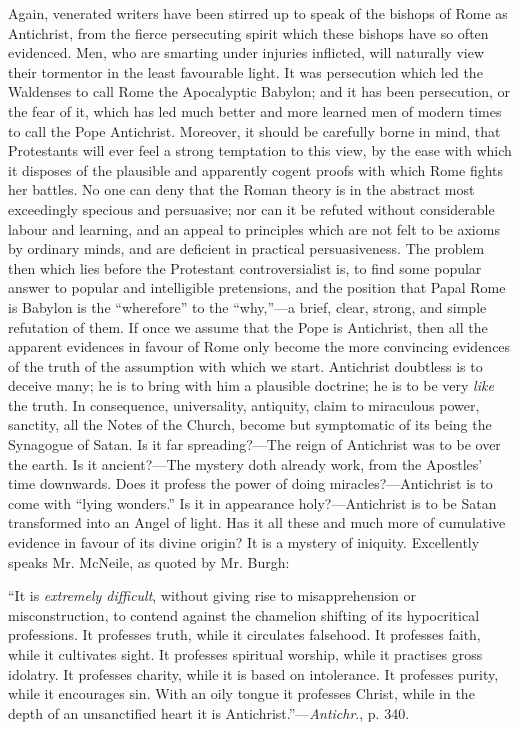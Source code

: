 Again, venerated writers have been stirred up to speak of the
bishops of Rome as Antichrist, from the fierce persecuting spirit
which these bishops have so often evidenced. Men, who are smarting
under injuries inflicted, will naturally view their tormentor in the
least favourable light. It was persecution which led the Waldenses to
call Rome the Apocalyptic Babylon; and it has been persecution, or the
fear of it, which has led much better and more learned men of modern
times to call the Pope Antichrist. Moreover, it should be carefully
borne in mind, that Protestants will ever feel a strong temptation to
this view, by the ease with which it disposes of the plausible and
apparently cogent proofs with which Rome fights her battles. No one
can deny that the Roman theory is in the abstract most exceedingly
specious and persuasive; nor can it be refuted without considerable
labour and learning, and an appeal to principles which are not felt to
be axioms by ordinary minds, and are deficient in practical
persuasiveness. The problem then which lies before the Protestant
controversialist is, to find some popular answer to popular and
intelligible pretensions, and the position that Papal Rome is Babylon
is the ``wherefore'' to the ``why,''—a brief, clear,
strong, and simple refutation of them. If once we assume that the Pope
is Antichrist, then all the apparent evidences in favour of Rome only
become the more convincing evidences of the truth of the assumption
with which we start. Antichrist doubtless is to deceive many; he is to
bring with him a plausible doctrine; he is to be very \emph{like} the truth.
In consequence, universality, antiquity, claim to miraculous power,
sanctity, all the Notes of the Church, become but symptomatic of its
being the Synagogue of Satan. Is it far spreading?—The reign of
Antichrist was to be over the earth. Is it ancient?—The mystery doth
already work, from the Apostles' time downwards. Does it profess
the power of doing miracles?—Antichrist is to come with ``lying
wonders.'' Is it in appearance holy?—Antichrist is to be Satan
transformed into an Angel of light. Has it all these and much more of
cumulative evidence in favour of its divine origin? It is a mystery of
iniquity. Excellently speaks Mr. McNeile, as quoted by Mr. Burgh:

``It is \emph{extremely difficult}, without giving rise to
misapprehension or misconstruction, to contend against the chamelion
shifting of its hypocritical professions. It professes truth, while it
circulates falsehood. It professes faith, while it cultivates sight.
It professes spiritual worship, while it practises gross idolatry. It
professes charity, while it is based on intolerance. It professes
purity, while it encourages sin. With an oily tongue it professes
Christ, while in the depth of an unsanctified heart it is
Antichrist.''—\emph{Antichr}., p. 340.

